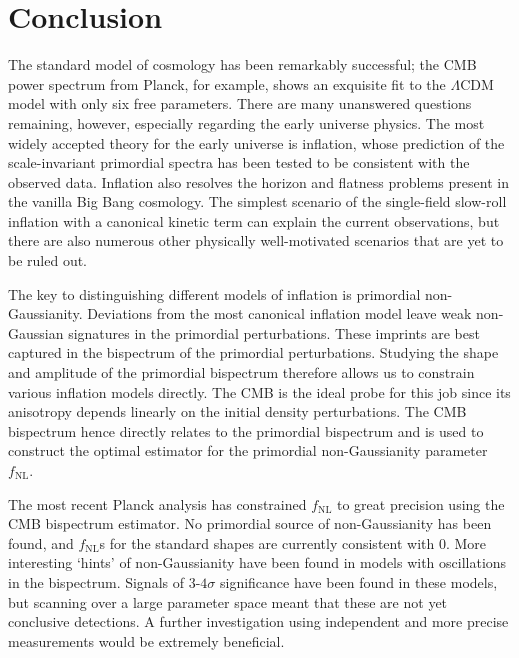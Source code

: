 \chapter{Conclusion}

The standard model of cosmology has been remarkably successful; the CMB power spectrum from Planck, for example, shows an exquisite fit to the $\Lambda$CDM model with only six free parameters. There are many unanswered questions remaining, however, especially regarding the early universe physics. The most widely accepted theory for the early universe is inflation, whose prediction of the scale-invariant primordial spectra has been tested to be consistent with the observed data. Inflation also resolves the horizon and flatness problems present in the vanilla Big Bang cosmology. The simplest scenario of the single-field slow-roll inflation with a canonical kinetic term can explain the current observations, but there are also numerous other physically well-motivated scenarios that are yet to be ruled out.

The key to distinguishing different models of inflation is primordial non-Gaussianity. Deviations from the most canonical inflation model leave weak non-Gaussian signatures in the primordial perturbations. These imprints are best captured in the bispectrum of the primordial perturbations. Studying the shape and amplitude of the primordial bispectrum therefore allows us to constrain various inflation models directly. The CMB is the ideal probe for this job since its anisotropy depends linearly on the initial density perturbations. The CMB bispectrum hence directly relates to the primordial bispectrum and is used to construct the optimal estimator for the primordial non-Gaussianity parameter $f_\text{NL}$. 

The most recent Planck analysis has constrained $f_\text{NL}$ to great precision using the CMB bispectrum estimator. No primordial source of non-Gaussianity has been found, and $f_\text{NL}$s for the standard shapes are currently consistent with $0$. More interesting `hints' of non-Gaussianity have been found in models with oscillations in the bispectrum. Signals of $3$-$4\sigma$ significance have been found in these models, but scanning over a large parameter space meant that these are not yet conclusive detections. A further investigation using independent and more precise measurements would be extremely beneficial.

